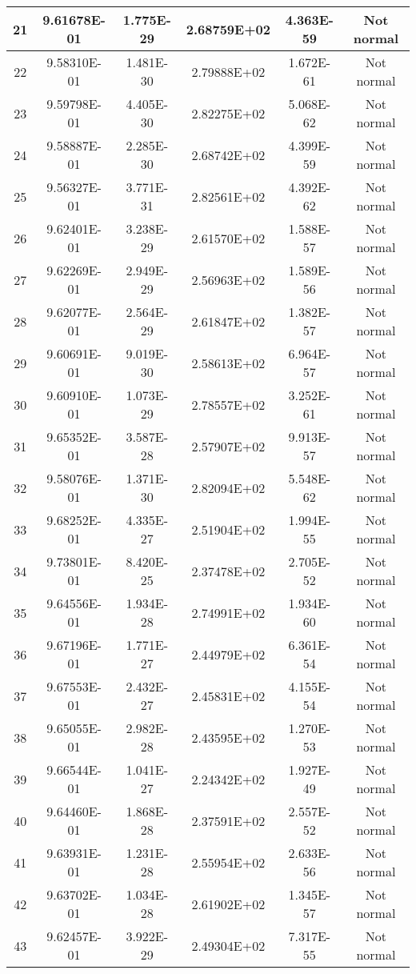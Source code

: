\begin{table}[h]
\begin{tabular}{|c|c|c|c|c|c|}
		21 & 9.61678E-01 & 1.775E-29 & 2.68759E+02 & 4.363E-59 & Not normal\\\hline
		22 & 9.58310E-01 & 1.481E-30 & 2.79888E+02 & 1.672E-61 & Not normal\\\hline
		23 & 9.59798E-01 & 4.405E-30 & 2.82275E+02 & 5.068E-62 & Not normal\\\hline
		24 & 9.58887E-01 & 2.285E-30 & 2.68742E+02 & 4.399E-59 & Not normal\\\hline
		25 & 9.56327E-01 & 3.771E-31 & 2.82561E+02 & 4.392E-62 & Not normal\\\hline
		26 & 9.62401E-01 & 3.238E-29 & 2.61570E+02 & 1.588E-57 & Not normal\\\hline
		27 & 9.62269E-01 & 2.949E-29 & 2.56963E+02 & 1.589E-56 & Not normal\\\hline
		28 & 9.62077E-01 & 2.564E-29 & 2.61847E+02 & 1.382E-57 & Not normal\\\hline
		29 & 9.60691E-01 & 9.019E-30 & 2.58613E+02 & 6.964E-57 & Not normal\\\hline
		30 & 9.60910E-01 & 1.073E-29 & 2.78557E+02 & 3.252E-61 & Not normal\\\hline
		31 & 9.65352E-01 & 3.587E-28 & 2.57907E+02 & 9.913E-57 & Not normal\\\hline
		32 & 9.58076E-01 & 1.371E-30 & 2.82094E+02 & 5.548E-62 & Not normal\\\hline
		33 & 9.68252E-01 & 4.335E-27 & 2.51904E+02 & 1.994E-55 & Not normal\\\hline
		34 & 9.73801E-01 & 8.420E-25 & 2.37478E+02 & 2.705E-52 & Not normal\\\hline
		35 & 9.64556E-01 & 1.934E-28 & 2.74991E+02 & 1.934E-60 & Not normal\\\hline
		36 & 9.67196E-01 & 1.771E-27 & 2.44979E+02 & 6.361E-54 & Not normal\\\hline
		37 & 9.67553E-01 & 2.432E-27 & 2.45831E+02 & 4.155E-54 & Not normal\\\hline
		38 & 9.65055E-01 & 2.982E-28 & 2.43595E+02 & 1.270E-53 & Not normal\\\hline
		39 & 9.66544E-01 & 1.041E-27 & 2.24342E+02 & 1.927E-49 & Not normal\\\hline
		40 & 9.64460E-01 & 1.868E-28 & 2.37591E+02 & 2.557E-52 & Not normal\\\hline
		41 & 9.63931E-01 & 1.231E-28 & 2.55954E+02 & 2.633E-56 & Not normal\\\hline
		42 & 9.63702E-01 & 1.034E-28 & 2.61902E+02 & 1.345E-57 & Not normal\\\hline
		43 & 9.62457E-01 & 3.922E-29 & 2.49304E+02 & 7.317E-55 & Not normal\\\hline

\end{tabular}
\end{table}
